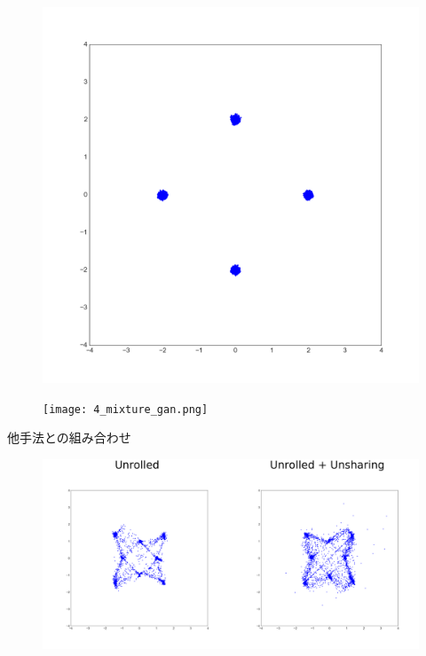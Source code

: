 \documentclass[dvipdfmx,12pt,unicode]{beamer}
\begin{document}
\begin{frame}
  \begin{figure}[htb]
    \begin{center}
      \includegraphics[width=\linewidth]{4_mixture_true.png}
    \end{center}
  \end{figure}
\end{frame}

\begin{frame}
  \begin{figure}[htb]
    \begin{center}
      \texttt{[image: 4\_mixture\_gan.png]}
    \end{center}
  \end{figure}
\end{frame}

\begin{frame}{他手法との組み合わせ}
  \begin{figure}[htb]
    \begin{center}
      \includegraphics[width=\linewidth]{unrolled.png}
    \end{center}
  \end{figure}
\end{frame}
\end{document}
